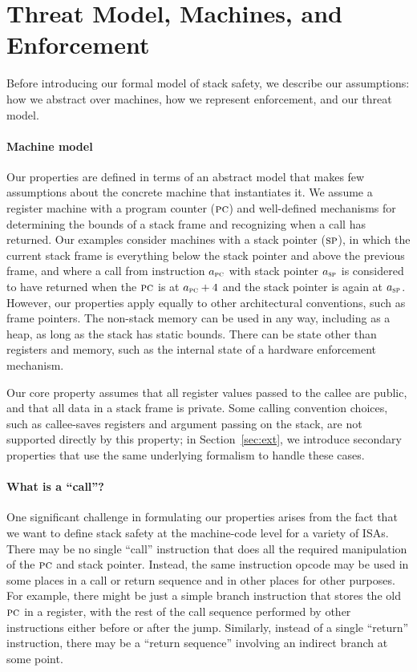 \documentclass[10pt,conference]{ieeetran}%
\theoremstyle{definition}
\begin{document}
\section{Threat Model, Machines, and Enforcement }
\label{sec:setup}
\label{sec:threat}

Before introducing our formal model of stack safety, we describe our assumptions:
how we abstract over machines, how we represent enforcement, and
our threat model.

\paragraph*{Machine model}
Our properties are defined in terms of an abstract model that makes few
assumptions about the concrete machine that instantiates it. We assume a
register machine with a program counter (\(\textsc{pc}\)) and well-defined
mechanisms for determining the bounds of a stack frame and recognizing when a call
has returned. Our examples consider machines with a stack pointer (\(\textsc{sp}\)),
in which the current stack frame is everything below the stack pointer and above the
previous frame, and where a call from instruction \(a_{\textsc{pc}}\) with
stack pointer \(a_{\textsc{sp}}\)
is considered to have returned when the \(\textsc{pc}\) is at \(a_{\textsc{pc}} + 4\) and the stack pointer
is again at \(a_{\textsc{sp}}\). However, our properties apply equally to
other architectural conventions, such as frame pointers.
The non-stack memory can be used in any way, including
as a heap, as long as the stack has static bounds. There can be
state other than registers and memory, such as the internal state of a hardware
enforcement mechanism.

Our core property assumes that all register values passed to the callee are public,
and that all data in a stack frame is private.
Some calling convention choices, such as callee-saves registers and argument
passing on the stack, are not supported directly by this property;
in Section~\ref{sec:ext},
we introduce
secondary properties that use the same underlying formalism to handle these cases.

\paragraph*{What is a ``call''?}  One significant challenge in formulating our
properties arises from the fact that we want to define stack safety at the
machine-code level for a variety of ISAs.  There may be no single ``call''
instruction that does all the
required manipulation of the \(\textsc{pc}\) and stack pointer. Instead, the
same instruction opcode may be
used in some places in a call or return sequence and in other places
for other purposes.
\ifspace
For example, there
might be just a simple branch instruction that stores the old \(\textsc{pc}\) in
a register, with the rest of the call sequence performed by other
instructions either before or after the jump.  Similarly, instead of a single
``return'' instruction,  there may be a ``return sequence'' involving an
indirect branch at some point.
\fi
\end{document}

